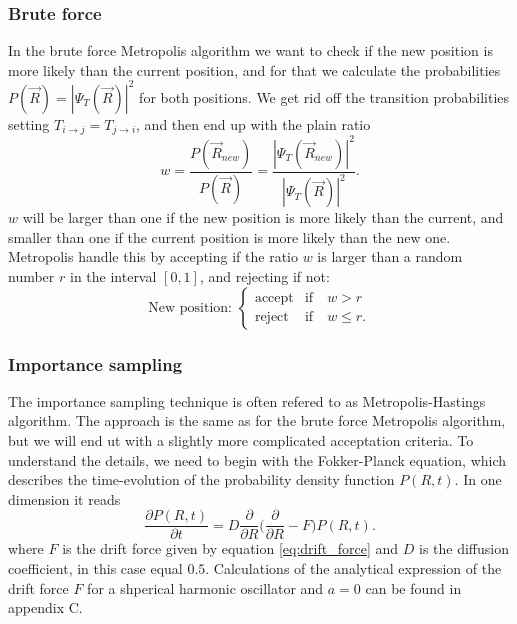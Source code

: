 \documentclass[norsk,a4paper,12pt]{article}
\begin{document}
\subsubsection{Brute force}
In the brute force Metropolis algorithm we want to check if the new position is more likely than the current position, and for that we calculate the probabilities $P(\vec{R})=|\Psi_T(\vec{R})|^2$ for both positions. We get rid off the transition probabilities setting $T_{i\rightarrow j}=T_{j\rightarrow i}$, and then end up with the plain ratio
\begin{equation}
w=\frac{P(\vec{R}_{new})}{P(\vec{R})}=\frac{|\Psi_T(\vec{R}_{new})|^2}{|\Psi_T(\vec{R})|^2}.
\end{equation}
$w$ will be larger than one if the new position is more likely than the current, and smaller than one if the current position is more likely than the new one. Metropolis handle this by accepting if the ratio $w$ is larger than a random number $r$ in the interval $[0,1]$, and rejecting if not:
\begin{equation}
\text{New position: }
\begin{cases} 
   \text{accept} & \text{if}\quad w > r \\
   \text{reject} & \text{if}\quad w \leq r.
\end{cases}
\end{equation}

\subsubsection{Importance sampling} \label{Importance_sampling}
The importance sampling technique is often refered to as Metropolis-Hastings algorithm. The approach is the same as for the brute force Metropolis algorithm, but we will end ut with a slightly more complicated acceptation criteria. To understand the details, we need to begin with the Fokker-Planck equation, which describes the time-evolution of the probability density function $P(R,t)$. In one dimension it reads
\begin{equation}
\frac{\partial P(R,t)}{\partial t} = D\frac{\partial}{\partial R}\bigg(\frac{\partial}{\partial R} - F\bigg)P(R,t).
\end{equation}
where $F$ is the drift force given by equation \ref{eq:drift_force} and $D$ is the diffusion coefficient, in this case equal $0.5$. Calculations of the analytical expression of the drift force $F$ for a shperical harmonic oscillator and $a=0$ can be found in appendix C.
\end{document}
